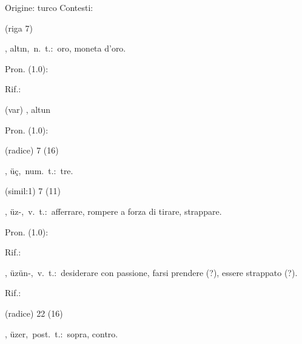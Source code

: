 \begin{glossario}{Origine: turco}
Contesti:
\begin{subvocedue}
\item[(riga 7)] 
\end{subvocedue}
\item[{\color{colorlowref}\spzrl{altUn}},] {\sf altın},\ n.\ t.:\ oro, moneta d'oro.
\begin{subvocedue}
\item[Pron. (1.0):] 
\item[Rif.:] 
\end{subvocedue}
\begin{subvocedue}
\item[(var)] , {\sf altun}\begin{subvocedue}
\item[Pron. (1.0):] 
\end{subvocedue}
\item[(radice)]   7 (16)
\end{subvocedue}
\item[{\color{colorlowref}\spzrl{:W^c}},] {\sf üç},\ num.\ t.:\ tre.
\begin{subvocedue}
\item[(simil:1)]   7 (11)
\end{subvocedue}
\item[{\color{colorlowref}\spzrl{:WzB}},] {\sf üz-},\ v.\ t.:\ afferrare, rompere a forza di tirare, strappare.
\begin{subvocedue}
\item[Pron. (1.0):] 
\item[Rif.:] 
\end{subvocedue}
\begin{subvocedue}
\item[\subglossariobullet] , {\sf üzün-},\ v.\ t.:\ desiderare con passione, farsi prendere (?), essere strappato (?).
\begin{subvocedue}
\item[Rif.:] 
\end{subvocedue}
\item[(radice)]   22 (16)
\end{subvocedue}
\item[{\color{colorlowref}\spzrl{:Wzer}},] {\sf üzer},\ post.\ t.:\ sopra, contro.
\begin{subvocedue}

\end{subvocedue}
\end{glossario}
